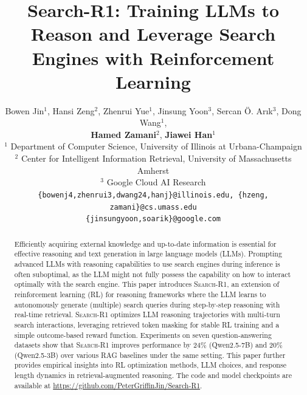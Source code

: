 \documentclass{article} %
\title{Search-R1: Training LLMs to Reason and Leverage Search Engines with Reinforcement Learning}
\author{Bowen Jin$^1$, Hansi Zeng$^2$, Zhenrui Yue$^1$, Jinsung Yoon$^3$, Sercan Ö. Arık$^3$, Dong Wang$^1$, \\
\textbf{Hamed Zamani}$^2$, \textbf{Jiawei Han}$^1$ \\
$^1$ Department of Computer Science, University of Illinois at Urbana-Champaign\\
$^2$ Center for Intelligent Information Retrieval, University of Massachusetts Amherst\\
$^3$ Google Cloud AI Research\\
\texttt{\{bowenj4,zhenrui3,dwang24,hanj\}@illinois.edu, \{hzeng, zamani\}@cs.umass.edu} \\
\texttt{\{jinsungyoon,soarik\}@google.com}
}
\newcommand{\Ours}{\textsc{Search-R1}\xspace}
\newcommand{\hamed}[1]{\textcolor{red}{[Hamed: #1]}}
\begin{document}
\ifcolmsubmission
\linenumbers
\fi

\maketitle

\begin{abstract}
Efficiently acquiring external knowledge and up-to-date information is essential for effective reasoning and text generation in large language models (LLMs). 
Prompting advanced LLMs with reasoning capabilities to use search engines during inference is often suboptimal, as the LLM might not fully possess the capability on how to interact optimally with the search engine. 
This paper introduces \Ours, an extension of reinforcement learning (RL) for reasoning frameworks where the LLM learns to autonomously generate (multiple) search queries during step-by-step reasoning with real-time retrieval.
\Ours optimizes LLM reasoning trajectories with multi-turn search interactions, leveraging retrieved token masking for stable RL training and a simple outcome-based reward function.
Experiments on seven question-answering datasets show that \Ours improves performance by 24\% (Qwen2.5-7B) and 20\% (Qwen2.5-3B) over various RAG baselines under the same setting. This paper further provides empirical insights into RL optimization methods, LLM choices, and response length dynamics in retrieval-augmented reasoning.
The code and model checkpoints are available at \url{https://github.com/PeterGriffinJin/Search-R1}.
\end{abstract}







\end{document}
